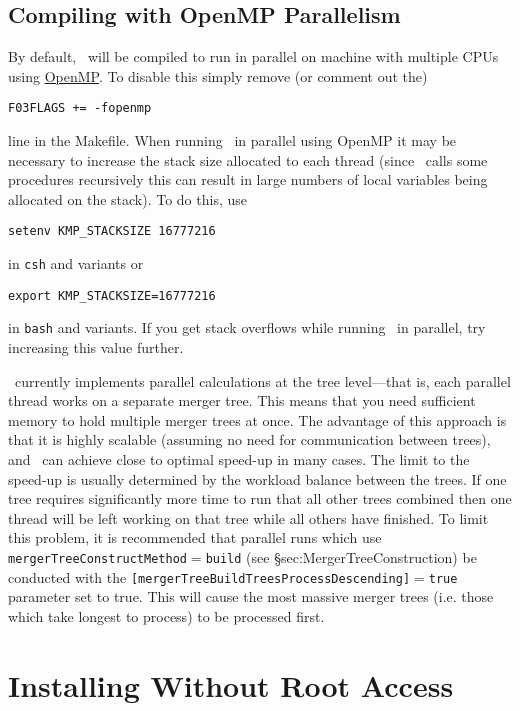\subsection{Compiling with OpenMP Parallelism}

By default, \glc\ will be compiled to run in parallel on machine with multiple CPUs using \href{http://openmp.org/wp/}{OpenMP}. To disable this simply remove (or comment out the)
\begin{verbatim}
F03FLAGS += -fopenmp
\end{verbatim}
line in the Makefile. When running \glc\ in parallel using OpenMP it may be necessary to increase the stack size allocated to each thread (since \glc\ calls some procedures recursively this can result in large numbers of local variables being allocated on the stack). To do this, use
\begin{verbatim}
setenv KMP_STACKSIZE 16777216
\end{verbatim}
in {\tt csh} and variants or
\begin{verbatim}
export KMP_STACKSIZE=16777216
\end{verbatim}
in {\tt bash} and variants. If you get stack overflows while running \glc\ in parallel, try increasing this value further.

\glc\ currently implements parallel calculations at the tree level---that is, each parallel thread works on a separate merger tree. This means that you need sufficient memory to hold multiple merger trees at once. The advantage of this approach is that it is highly scalable (assuming no need for communication between trees), and \glc\ can achieve close to optimal speed-up in many cases. The limit to the speed-up is usually determined by the workload balance between the trees. If one tree requires significantly more time to run that all other trees combined then one thread will be left working on that tree while all others have finished. To limit this problem, it is recommended that parallel runs which use {\tt mergerTreeConstructMethod}$=${\tt build} (see \S{sec:MergerTreeConstruction}) be conducted with the {\tt [mergerTreeBuildTreesProcessDescending]}$=${\tt true} parameter set to true. This will cause the most massive merger trees (i.e. those which take longest to process) to be processed first.

\section{Installing Without Root Access}


